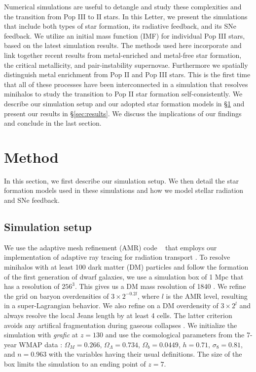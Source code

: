 \documentclass[apjl]{emulateapj}
\begin{document}
Numerical simulations are useful to detangle and study these
complexities and the transition from Pop III to II stars.  In this
Letter, we present the simulations that include both types of star
formation, its radiative feedback, and its SNe feedback.  We utilize
an initial mass function (IMF) for individual Pop III stars, based on
the latest simulation results.  The methods used here incorporate and
link together recent results from metal-enriched and metal-free star
formation, the critical metallicity, and pair-instability supernovae.
Furthermore we spatially distinguish metal enrichment from Pop II and
Pop III stars.  This is the first time that all of these processes
have been interconnected in a simulation that resolves minihalos to
study the transition to Pop II star formation self-consistently.  We
describe our simulation setup and our adopted star formation models in
\S \ref{sec:setup} and present our results in \S \ref{sec:results}.
We discuss the implications of our findings and conclude in the last
section.

\section{Method}
\label{sec:setup}

In this section, we first describe our simulation setup.  We then
detail the star formation models used in these simulations and how we
model stellar radiation and SNe feedback.

\subsection{Simulation setup}

We use the adaptive mesh refinement (AMR) code
\enzo~\citep{BryanNorman1997, OShea2004} that employs our
implementation of adaptive ray tracing for radiation transport
\citep{Wise10}.  To resolve minihalos with at least 100 dark matter
(DM) particles and follow the formation of the first generation of
dwarf galaxies, we use a simulation box of 1 Mpc that has a resolution
of $256^3$.  This gives us a DM mass resolution of 1840 \Ms.  We
refine the grid on baryon overdensities of $3 \times 2^{-0.2l}$, where
$l$ is the AMR level, resulting in a super-Lagrangian behavior.  We
also refine on a DM overdensity of $3 \times 2^l$ and always resolve
the local Jeans length by at least 4 cells.  The latter criterion
avoids any artifical fragmentation during gaseous collapses
\citep{Truelove97}.  We initialize the simulation with \textsl{grafic}
\citep{Bertschinger01} at $z = 130$ and use the cosmological
parameters from the 7-year WMAP data \citep{WMAP7}: $\Omega_M =
0.266$, $\Omega_\Lambda = 0.734$, $\Omega_b = 0.0449$, $h = 0.71$,
$\sigma_8 = 0.81$, and $n = 0.963$ with the variables having their
usual definitions.  The size of the box limits the simulation to an
ending point of $z=7$.
\end{document}
